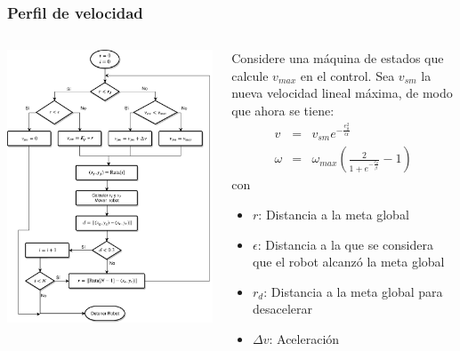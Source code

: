 \documentclass[10pt,spanish,aspectratio=1610]{beamer}
\begin{document}
\begin{frame}\frametitle{Perfil de velocidad}
  \begin{columns}
    \begin{column}{0.43\textwidth}
      \includegraphics[width=\textwidth]{Figures/AFSM.pdf}
    \end{column}
    \begin{column}{0.5\textwidth}
      Considere una máquina de estados que calcule $v_{max}$ en el control. Sea $v_{sm}$ la nueva velocidad lineal máxima, de modo que ahora se tiene:
      \begin{eqnarray*}
        v      &=& v_{sm}e^{-\frac{e_{\theta}^{2}}{\alpha}}\label{eq:NewControl1}\\
        \omega &=& \omega_{max}\left(\frac{2}{1+e^{-\frac{e_{\theta}}{\beta}}}-1\right)\label{eq:NewControl2}
      \end{eqnarray*}
      con
      \begin{itemize}
      \item $r$: Distancia a la meta global
      \item $\epsilon$: Distancia a la que se considera que el robot alcanzó la meta global
      \item $r_d$: Distancia a la meta global para desacelerar
      \item $\Delta v$: Aceleración 
      \end{itemize}
    \end{column}
  \end{columns}
\end{frame}
\end{document}
